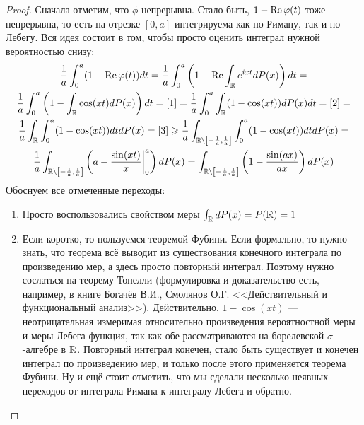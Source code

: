\begin{proof}
    Сначала отметим, что $\phi$ непрерывна. Стало быть, $1 - \operatorname{Re}\varphi(t)$ тоже непрерывна, то есть на отрезке $[0, a]$ интегрируема как по Риману, так и по Лебегу. Вся идея состоит в том, чтобы просто оценить интеграл нужной вероятностью снизу:
    \begin{multline*}
        \frac{1}{a} \int_0^a (1 - \operatorname{Re}\varphi(t))dt = \frac{1}{a} \int_0^a \left(1 - \operatorname{Re} \int_{\mathbb{R}} e^{ixt}dP(x)\right)dt =
        \\
        \frac{1}{a} \int_0^a \left(1 - \int_{\mathbb{R}} \cos(xt)dP(x)\right)dt = [1] = \frac{1}{a} \int_0^a \int_{\mathbb{R}} (1 - \cos(xt)) dP(x) dt = [2] =
        \\
        \frac{1}{a} \int_{\mathbb{R}} \int_0^a (1 - \cos(xt))dt dP(x) = [3] \geqslant 
        \frac{1}{a} \int_{\mathbb{R} \backslash \left[ -\frac{1}{a}, \frac{1}{a}\right]} \int_0^a (1 - \cos(xt))dt dP(x) =
        \\
        \frac{1}{a} \int_{\mathbb{R} \backslash \left[  -\frac{1}{a}, \frac{1}{a}\right]} \left(a - \frac{\sin(xt)}{x} \bigg|_0^a\right)dP(x) = \int_{\mathbb{R} \backslash \left[-\frac{1}{a}, \frac{1}{a}\right]} \left(1 - \frac{\sin(ax)}{ax}\right)dP(x)
    \end{multline*}
    Обоснуем все отмеченные переходы:
    \begin{enumerate}
    	\item Просто воспользовались свойством меры $\int_{\mathbb{R}} dP(x) = P(\mathbb{R}) = 1$
    	
    	\item Если коротко, то пользуемся теоремой Фубини. Если формально, то нужно знать, что теорема всё выводит из существования конечного интеграла по произведению мер, а здесь просто повторный интеграл. Поэтому нужно сослаться на теорему Тонелли (формулировка и доказательство есть, например, в книге Богачёв В.И., Смолянов О.Г. <<Действительный и функциональный анализ>>). Действительно, $1 - \cos(xt)$ --- неотрицательная измеримая относительно произведения вероятностной меры и меры Лебега функция, так как обе рассматриваются на борелевской $\sigma$-алгебре в $\mathbb{R}$. Повторный интеграл конечен, стало быть существует и конечен интеграл по произведению мер, и только после этого применяется теорема Фубини. Ну и ещё стоит отметить, что мы сделали несколько неявных переходов от интеграла Римана к интегралу Лебега и обратно.
    	

\end{enumerate}
\end{proof}
